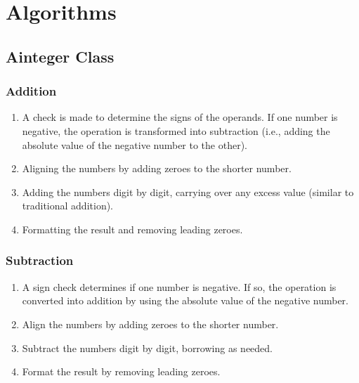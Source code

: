 \documentclass[12pt]{article}
\begin{document}
\section{Algorithms}

\subsection{Ainteger Class}

\subsubsection{Addition}
\begin{enumerate}
    \item A check is made to determine the signs of the operands. If one number is negative, the operation is transformed into subtraction (i.e., adding the absolute value of the negative number to the other).
    \item Aligning the numbers by adding zeroes to the shorter number.
    \item Adding the numbers digit by digit, carrying over any excess value (similar to traditional addition).
    \item Formatting the result and removing leading zeroes.
\end{enumerate}

\subsubsection{Subtraction}
\begin{enumerate}
    \item A sign check determines if one number is negative. If so, the operation is converted into addition by using the absolute value of the negative number.
    \item Align the numbers by adding zeroes to the shorter number.
    \item Subtract the numbers digit by digit, borrowing as needed.
    \item Format the result by removing leading zeroes.
\end{enumerate}
\end{document}
